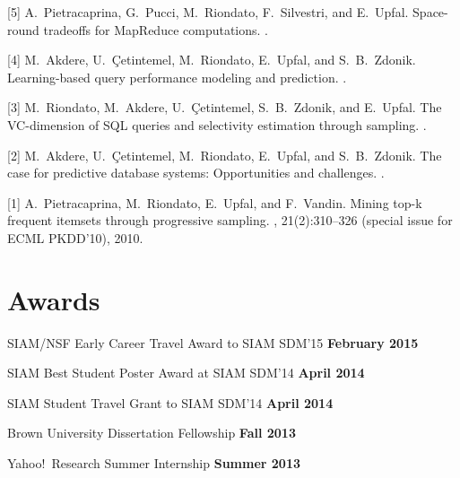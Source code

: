 \documentclass[margin,line]{resume}
\begin{document}
[5] A.~Pietracaprina, G.~Pucci, M.~Riondato, F.~Silvestri, and E.~Upfal.
\newblock Space-round tradeoffs for {MapReduce} computations.
.

[4] M.~Akdere, U.~\c{C}etintemel, M.~Riondato, E.~Upfal, and S.~B.~Zdonik.
\newblock Learning-based query performance modeling and prediction.
.

[3] M.~Riondato, M.~Akdere, U.~\c{C}etintemel, S.~B.~Zdonik, and E.~Upfal.
\newblock The {VC}-dimension of {SQL} queries and selectivity estimation
  through sampling.
.


[2] M.~Akdere, U.~\c{C}etintemel, M.~Riondato, E.~Upfal, and S.~B.~Zdonik.
\newblock The case for predictive database systems: Opportunities and
  challenges.
.

[1] A.~Pietracaprina, M.~Riondato, E.~Upfal, and F.~Vandin.
\newblock Mining top-k frequent itemsets through progressive sampling.
, 21(2):310--326 (special issue for
ECML PKDD'10), 2010.



\section{\sc Awards}

SIAM/NSF Early Career Travel Award to SIAM SDM'15 \hfill {\bf February 2015}

SIAM Best Student Poster Award at SIAM SDM'14 \hfill {\bf April 2014}

SIAM Student Travel Grant to SIAM SDM'14 \hfill {\bf April 2014}

Brown University Dissertation Fellowship \hfill {\bf Fall 2013}

Yahoo!~Research Summer Internship \hfill {\bf Summer 2013}
\end{document}
